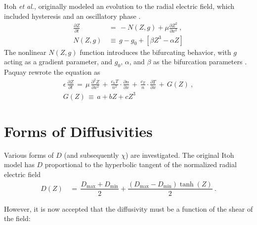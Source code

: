 Itoh \emph{et al.}, originally modeled an evolution to the radial electric field, which included hysteresis and an oscillatory phase \cite{itoh_edge_1991}.
\begin{align} %
	\frac{\partial Z}{\partial t} \,&=\, -N(Z,g) + \mu \frac{\partial Z^2}{\partial x^2}~,\label{eq:original_z} \\
	N(Z,g) \,&\equiv\, g - g_0 + \left[\beta Z^3 - \alpha Z\right]
\end{align}
The nonlinear $N(Z,g)$ function introduces the bifurcating behavior, with $g$ acting as a gradient parameter, and $g_0$, $\alpha$, and $\beta$ as the bifurcation parameters \cite{itoh_model_1988}.
Paquay rewrote the equation as
\begin{align} %
	\epsilon \, \frac{\partial Z}{\partial t} \,=\, \mu \, \frac{\partial^2 Z}{\partial x^2} \,+\, \frac{c_n T}{n^2} \cdot \frac{\partial n}{\partial x} \,+\, \frac{c_T}{n} \cdot \frac{\partial T}{\partial x} \,+\, G(Z)~,\label{eq:paquay_Z} \\
	G(Z) \,\equiv\, a + bZ + cZ^3 \label{eq:G_polynomial}
\end{align}

\section{Forms of Diffusivities}\label{sec:diffusivities}
Various forms of $D$ (and subsequently $\chi$) are investigated.
The original Itoh model has $D$ proportional to the hyperbolic tangent of the normalized radial electric field \cite{itoh_edge_1991} \cite{zohm_dynamic_1994}
\begin{align} %
	D(Z) \,&=\, \dfrac{D_\text{max} + D_\text{min}}{2} + \dfrac{(D_\text{max} - D_\text{min})\tanh(Z)}{2}~. \label{eq:Itoh_diffusivity}
\end{align}

However, it is now accepted that the diffusivity must be a function of the shear of the field:

